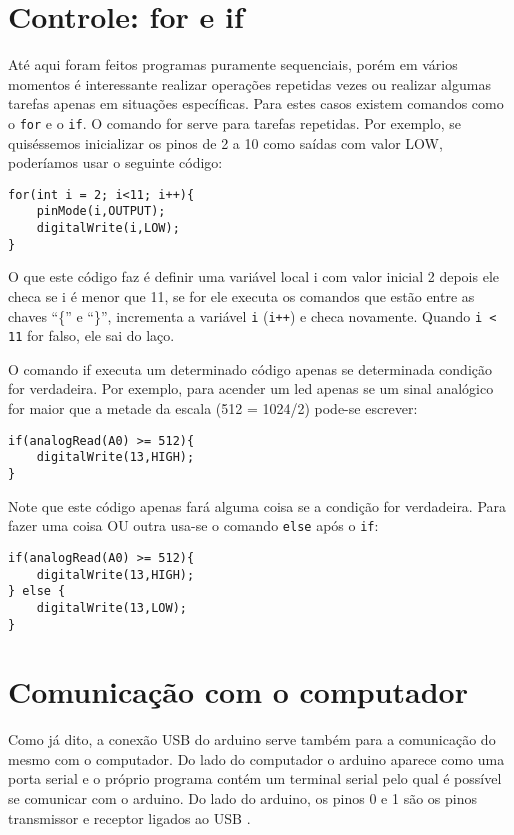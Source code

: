 \section{Controle: for e if}
Até aqui foram feitos programas puramente sequenciais, porém em vários momentos é interessante realizar operações repetidas vezes ou realizar algumas tarefas apenas em situações específicas. Para estes casos existem comandos como o \lstinline|for| e o \lstinline|if|.
O comando for serve para tarefas repetidas. Por exemplo, se quiséssemos inicializar os pinos de 2 a 10 como saídas com valor LOW, poderíamos usar o seguinte código:
\begin{lstlisting}
for(int i = 2; i<11; i++){
	pinMode(i,OUTPUT);
	digitalWrite(i,LOW);
}	
\end{lstlisting}
O que este código faz é definir uma variável local i com valor inicial 2 depois ele checa se i é menor que 11, se for ele executa os comandos que estão entre as chaves ``\{'' e ``\}'', incrementa a variável \lstinline|i| (\lstinline|i++|) e checa novamente. Quando \lstinline|i < 11| for falso, ele sai do laço.

O comando if executa um determinado código apenas se determinada condição for verdadeira. Por exemplo, para acender um led apenas se um sinal analógico for maior que a metade da escala (512 = 1024/2)  pode-se escrever:
\begin{lstlisting}
if(analogRead(A0) >= 512){
	digitalWrite(13,HIGH);
}
\end{lstlisting}

Note que este código apenas fará alguma coisa se a condição for verdadeira. Para fazer uma coisa OU outra usa-se o comando \lstinline|else| após o \lstinline|if|:
\begin{lstlisting}
if(analogRead(A0) >= 512){
	digitalWrite(13,HIGH);
} else {
	digitalWrite(13,LOW);
}
\end{lstlisting}
\section{Comunicação com o computador}
Como já dito, a conexão USB do arduino serve também para a comunicação do mesmo com o computador. Do lado do computador o arduino aparece como uma porta serial e o próprio programa contém um terminal serial pelo qual é possível se comunicar com o arduino. Do lado do arduino, os pinos 0 e 1 são os pinos transmissor e receptor ligados ao USB .

